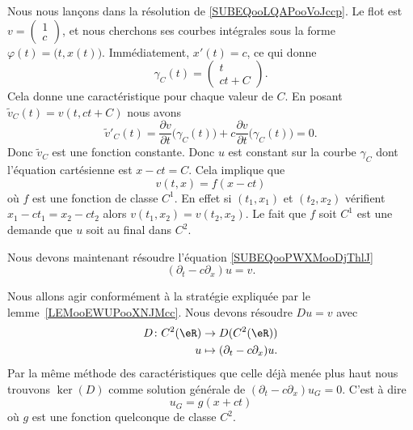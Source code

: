 Nous nous lançons dans la résolution de \eqref{SUBEQooLQAPooVoJccp}. Le flot est \( v=\begin{pmatrix}
    1    \\
    c
\end{pmatrix}\), et nous cherchons ses courbes intégrales sous la forme \( \varphi(t)=\big( t,x(t) \big)\). Immédiatement, \( x'(t)=c\), ce qui donne
\begin{equation}
    \gamma_C(t)=\begin{pmatrix}
        t    \\
        ct+C
    \end{pmatrix}.
\end{equation}
Cela donne une caractéristique pour chaque valeur de \( C\). En posant \( \tilde v_C(t)=v(t,ct+C)\) nous avons
\begin{equation}
    \tilde v'_C(t)=\frac{ \partial v }{ \partial t }\big( \gamma_C(t) \big)+c\frac{ \partial v }{ \partial t }\big( \gamma_C(t) \big)=0.
\end{equation}
Donc \( \tilde v_C\) est une fonction constante. Donc \( u\) est constant sur la courbe \( \gamma_C\) dont l'équation cartésienne est \( x-ct=C\). Cela implique que
\begin{equation}
    v(t,x)=f(x-ct)
\end{equation}
où \( f\) est une fonction de classe \( C^1\). En effet si \( (t_1,x_1)\) et \( (t_2,x_2)\) vérifient \( x_1-ct_1=x_2-ct_2\) alors \( v(t_1,x_2)=v(t_2,x_2)\). Le fait que \( f\) soit \( C^1\) est une demande que \( u\) soit au final dans \( C^2\).

Nous devons maintenant résoudre l'équation \eqref{SUBEQooPWXMooDjThlJ}
\begin{equation}
    (\partial_t-c\partial_x)u=v.
\end{equation}

Nous allons agir conformément à la stratégie expliquée par le lemme~\ref{LEMooEWUPooXNJMcc}. Nous devons résoudre \( Du=v\) avec
\begin{equation}
    \begin{aligned}
        D\colon C^2(\eR)&\to D(C^2(\eR)) \\
        u&\mapsto (\partial_t-c\partial_x)u.
    \end{aligned}
\end{equation}
Par la même méthode des caractéristiques que celle déjà menée plus haut nous trouvons \( \ker(D)\) comme solution générale de \( (\partial_t-c\partial_x)u_G=0\). C'est à dire
\begin{equation}
    u_G=g(x+ct)
\end{equation}
où \( g\) est une fonction quelconque de classe \( C^2\).

